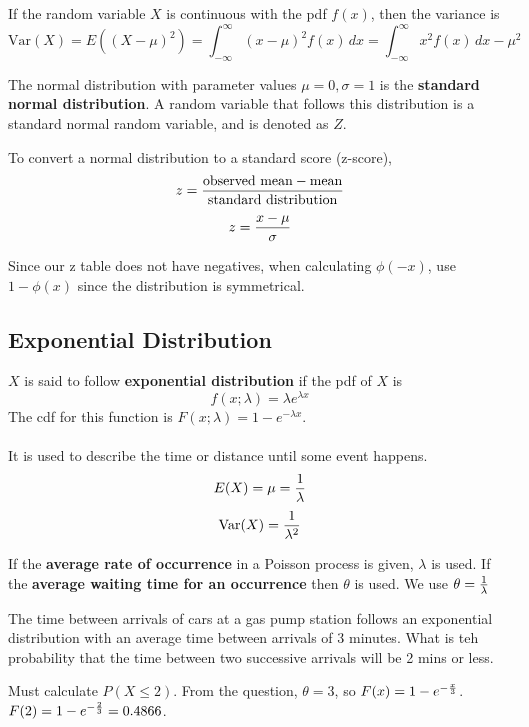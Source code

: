 \documentclass[english, 12pt]{article}
\begin{document}
\begin{defn}
If the random variable $X$ is continuous with the pdf $f(x)$, then the variance is
\[\text{Var}(X) = E((X-\mu)^2) = \int_{-\infty}^\infty (x-\mu)^2 f(x)\,dx = \int_{-\infty}^\infty x^2 f(x)\,dx - \mu^2\]
\end{defn}



\begin{defn}
The normal distribution with parameter values $\mu = 0, \sigma = 1$ is the \textbf{standard normal distribution}. A random variable that follows this distribution is a standard normal random variable, and is denoted as $Z$.
\end{defn}

To convert a normal distribution to a standard score (z-score),
\[z = \frac{\text{observed mean} - \text{mean}}{\text{standard distribution}}\]
\[z = \frac{x - \mu}{\sigma}\]


\begin{note}
Since our z table does not have negatives, when calculating $\phi(-x)$, use $1 - \phi(x)$ since the distribution is symmetrical.
\end{note}

\subsection{Exponential Distribution}
\begin{defn}
$X$ is said to follow \textbf{exponential distribution} if the pdf of $X$ is
\[f(x;\lambda) = \lambda e^{\lambda x}\]
The cdf for this function is $F(x;\lambda) = 1 - e^{- \lambda x}$. \\\\
It is used to describe the time or distance until some event happens.
\[E(X) = \mu = \frac{1}{\lambda}\]
\[\text{Var}(X) = \frac{1}{\lambda^2}\]

\begin{note}
If the \textbf{average rate of occurrence} in a Poisson process is given, $\lambda$ is used. If the \textbf{average waiting time for an occurrence} then $\theta$ is used. We use $\theta = \frac{1}{\lambda}$
\end{note}
\end{defn}

\begin{exmp}
The time between arrivals of cars at a gas pump station follows an exponential distribution with an average time between arrivals of 3 minutes. What is teh probability that the time between two successive arrivals will be 2 mins or less.

\begin{sol}
Must calculate $P(X \leq 2)$. From the question, $\theta = 3$, so $F(x) = 1 - e^{-\frac{x}{3}}$. $F(2) = 1 - e^{-\frac{2}{3}} = 0.4866$.
\end{sol}
\end{exmp}
\end{document}
